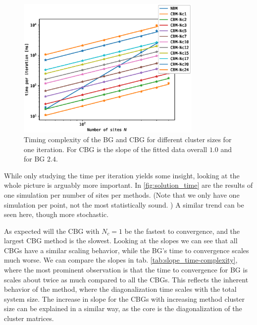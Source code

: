 \documentclass[11pt]{article}
\begin{document}
\begin{figure}[ht!]
	\centering
	\includegraphics[width=0.8\textwidth]{figures/timing_analysis_time_per_iteration.eps}
	\caption{ Timing complexity of the BG and CBG for different cluster sizes for one iteration. For CBG is the slope of the fitted data overall $1.0$ and for BG $2.4$. }
	\label{fig:iteration_time}
\end{figure}

While only studying the time per iteration yields some insight, looking at the whole picture is arguably more important. In \ref{fig:solution_time} are the results of one simulation per number of sites per methods. (Note that we only have one simulation per point, not the most statistically sound. ) A similar trend can be seen here, though more stochastic. 

As expected will the CBG with $N_c = 1$ be the fastest to convergence, and the largest CBG method is the slowest. Looking at the slopes we can see that all CBGs have a similar scaling behavior, while the BG's time to convergence scales much worse. We can compare the slopes in tab. \ref{tab:slope_time-complexity}, where the most prominent observation is that the time to convergence for BG is scales about twice as much compared to all the CBGs. This reflects the inherent behavior of the method, where the diagonalization time scales with the total system size. The increase in slope for the CBGs with increasing method cluster size can be explained in a similar way, as the core is the diagonalization of the cluster matrices. 
\end{document}
